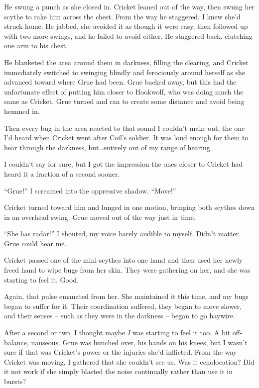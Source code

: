 He swung a punch as she closed in.  Cricket leaned out of the way, then swung her scythe to rake him across the chest.  From the way he staggered, I knew she'd struck home.  He jabbed, she avoided it as though it were easy, then followed up with two more swings, and he failed to avoid either.  He staggered back, clutching one arm to his chest.



He blanketed the area around them in darkness, filling the clearing, and Cricket immediately switched to swinging blindly and ferociously around herself as she advanced toward where Grue had been.  Grue backed away, but this had the unfortunate effect of putting him closer to Hookwolf, who was doing much the same as Cricket.  Grue turned and ran to create some distance and avoid being hemmed in.



Then every bug in the area reacted to that sound I couldn't make out, the one I'd heard when Cricket went after Coil's soldier.  It was loud enough for them to hear through the darkness, but\ldots entirely out of my range of hearing.



I couldn't say for sure, but I got the impression the ones closer to Cricket had heard it a fraction of a second sooner.



``Grue!'' I screamed into the oppressive shadow.  ``Move!''



Cricket turned toward him and lunged in one motion, bringing both scythes down in an overhead swing.  Grue moved out of the way just in time.



``She has radar!'' I shouted, my voice barely audible to myself.  Didn't matter.  Grue could hear me.



Cricket passed one of the mini-scythes into one hand and then used her newly freed hand to wipe bugs from her skin.  They were gathering on her, and she was starting to feel it.  Good.



Again, that pulse emanated from her.  She maintained it this time, and my bugs began to suffer for it.  Their coordination suffered, they began to move slower, and their senses – such as they were in the darkness – began to go haywire.



After a second or two, I thought maybe \emph{I} was starting to feel it too.  A bit off-balance, nauseous.  Grue was hunched over, his hands on his knees, but I wasn't sure if that was Cricket's power or the injuries she'd inflicted.  From the way Cricket was moving, I gathered that she couldn't see us.  Was it echolocation?  Did it not work if she simply blasted the noise continually rather than use it in bursts?



